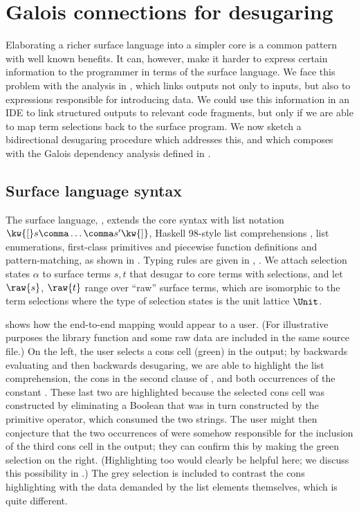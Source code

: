 \section{Galois connections for desugaring}
\label{sec:surface-language}

Elaborating a richer surface language into a simpler core is a common pattern with well known benefits. It can, however, make it harder to express certain information to the programmer in terms of the surface language. We face this problem with the analysis in , which links outputs not only to inputs, but also to expressions responsible for introducing data. We could use this information in an IDE to link structured outputs to relevant code fragments, but only if we are able to map term selections back to the surface program. We now sketch a bidirectional desugaring procedure which addresses this, and which composes with the Galois dependency analysis defined in .



\subsection{Surface language syntax}

The surface language, \OurLanguage{}, extends the core syntax with list notation $\kw{[} s \comma \ldots \comma s' \kw{]}$, Haskell 98-style list comprehensions \cite{peytonJones03}, list enumerations, first-class primitives and piecewise function definitions and pattern-matching, as shown in . Typing rules are \ifappendices given in , \else \IncludedWithSupplementaryMaterial\fi. We attach selection states $\alpha$ to surface terms $s, t$ that desugar to core terms with selections, and let $\raw{s}$, $\raw{t}$ range over ``raw'' surface terms, which are isomorphic to the term selections where the type of selection states is the unit lattice $\Unit$.

 shows how the end-to-end mapping would appear to a user. (For illustrative purposes the library function  and some raw data are included in the same source file.) On the left, the user selects a cons cell (green) in the output; by backwards evaluating and then backwards desugaring, we are able to highlight the list comprehension, the cons in the second clause of , and both occurrences of the constant . These last two are highlighted because the selected cons cell was constructed by eliminating a Boolean that was in turn constructed by the primitive \kw{==} operator, which consumed the two strings. The user might then conjecture that the two occurrences of  were somehow responsible for the inclusion of the third cons cell in the output; they can confirm this by making the green selection on the right. (Highlighting \kw{==} too would clearly be helpful here; we discuss this possibility in .) The grey selection is included to contrast the cons highlighting with the data demanded by the list elements themselves, which is quite different.

